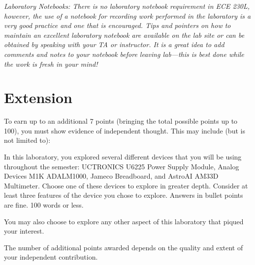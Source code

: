\documentclass[12pt]{../manual}
\begin{document}
\textit{Laboratory Notebooks:  There is no laboratory notebook requirement in ECE 230L, however, the use of a notebook for recording work performed in the laboratory is a very good practice and one that is encouraged.  Tips and pointers on how to maintain an excellent laboratory notebook are available on the lab site or can be obtained by speaking with your TA or instructor. It is a great idea to add comments and notes to your notebook before leaving lab---this is best done while the work is fresh in your mind!}
\newpage
\section{Extension}
To earn up to an additional 7 points (bringing the total possible points up to 100), you must show evidence of independent thought. This may include (but is not limited to):

In this laboratory, you explored several different devices that you will be using throughout the semester: UCTRONICS U6225 Power Supply Module, Analog Devices M1K ADALM1000, Jameco Breadboard, and AstroAI AM33D Multimeter. Choose one of these devices to explore in greater depth. Consider at least three features of the device you chose to explore. Answers in bullet points are fine. 100 words or less.

You may also choose to explore any other aspect of this laboratory that piqued your interest.

The number of additional points awarded depends on the quality and extent of your independent contribution.
\end{document}
